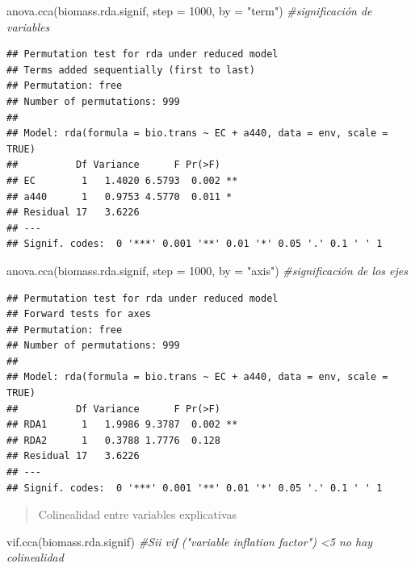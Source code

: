 \documentclass[
]{book}
\newenvironment{Shaded}{\begin{snugshade}}{\end{snugshade}}
\newcommand{\AttributeTok}[1]{\textcolor[rgb]{0.77,0.63,0.00}{#1}}
\newcommand{\CommentTok}[1]{\textcolor[rgb]{0.56,0.35,0.01}{\textit{#1}}}
\newcommand{\DecValTok}[1]{\textcolor[rgb]{0.00,0.00,0.81}{#1}}
\newcommand{\FunctionTok}[1]{\textcolor[rgb]{0.00,0.00,0.00}{#1}}
\newcommand{\NormalTok}[1]{#1}
\newcommand{\StringTok}[1]{\textcolor[rgb]{0.31,0.60,0.02}{#1}}
\begin{document}
\begin{Shaded}
\begin{Highlighting}[]
\FunctionTok{anova.cca}\NormalTok{(biomass.rda.signif, }\AttributeTok{step =} \DecValTok{1000}\NormalTok{, }\AttributeTok{by =} \StringTok{"term"}\NormalTok{) }\CommentTok{\#significación de variables }
\end{Highlighting}
\end{Shaded}

\begin{verbatim}
## Permutation test for rda under reduced model
## Terms added sequentially (first to last)
## Permutation: free
## Number of permutations: 999
## 
## Model: rda(formula = bio.trans ~ EC + a440, data = env, scale = TRUE)
##          Df Variance      F Pr(>F)   
## EC        1   1.4020 6.5793  0.002 **
## a440      1   0.9753 4.5770  0.011 * 
## Residual 17   3.6226                 
## ---
## Signif. codes:  0 '***' 0.001 '**' 0.01 '*' 0.05 '.' 0.1 ' ' 1
\end{verbatim}

\begin{Shaded}
\begin{Highlighting}[]
\FunctionTok{anova.cca}\NormalTok{(biomass.rda.signif, }\AttributeTok{step =} \DecValTok{1000}\NormalTok{, }\AttributeTok{by =} \StringTok{"axis"}\NormalTok{) }\CommentTok{\#significación de los ejes}
\end{Highlighting}
\end{Shaded}

\begin{verbatim}
## Permutation test for rda under reduced model
## Forward tests for axes
## Permutation: free
## Number of permutations: 999
## 
## Model: rda(formula = bio.trans ~ EC + a440, data = env, scale = TRUE)
##          Df Variance      F Pr(>F)   
## RDA1      1   1.9986 9.3787  0.002 **
## RDA2      1   0.3788 1.7776  0.128   
## Residual 17   3.6226                 
## ---
## Signif. codes:  0 '***' 0.001 '**' 0.01 '*' 0.05 '.' 0.1 ' ' 1
\end{verbatim}

\begin{quote}
Colinealidad entre variables explicativas
\end{quote}

\begin{Shaded}
\begin{Highlighting}[]
\FunctionTok{vif.cca}\NormalTok{(biomass.rda.signif) }\CommentTok{\#Sii vif ("variable inflation factor") \textless{}5 no hay colinealidad}
\end{Highlighting}
\end{Shaded}
\end{document}
